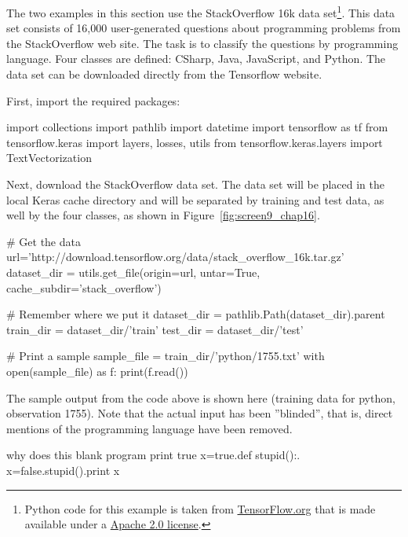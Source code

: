 The two examples in this section use the StackOverflow 16k data set\footnote{Python code for this example is taken from \href{https://www.tensorflow.org/tutorials/load_data/text}{TensorFlow.org} that is made available under a \href{https://www.apache.org/licenses/LICENSE-2.0}{Apache 2.0 license}.}. This data set consists of 16,000 user-generated questions about programming problems from the StackOverflow web site. The task is to classify the questions by programming language. Four classes are defined: CSharp, Java, JavaScript, and Python. The data set can be downloaded directly from the Tensorflow website.

First, import the required packages:

\begin{samepage}
\begin{pythoncode}
import collections
import pathlib
import datetime
import tensorflow as tf
from tensorflow.keras import layers, losses, utils
from tensorflow.keras.layers import TextVectorization
\end{pythoncode}
\end{samepage}

Next, download the StackOverflow data set. The data set will be placed in the local Keras cache directory and will be separated by training and test data, as well by the four classes, as shown in Figure~\ref{fig:screen9_chap16}.

\begin{samepage}
\begin{pythoncode}
# Get the data
url='http://download.tensorflow.org/data/stack_overflow_16k.tar.gz'
dataset_dir = utils.get_file(origin=url, untar=True,
        cache_subdir='stack_overflow')

# Remember where we put it
dataset_dir = pathlib.Path(dataset_dir).parent
train_dir = dataset_dir/'train'
test_dir = dataset_dir/'test'

# Print a sample
sample_file = train_dir/'python/1755.txt'
with open(sample_file) as f:
  print(f.read())
\end{pythoncode}
\end{samepage}

The sample output from the code above is shown here (training data for python, observation 1755). Note that the actual input has been ''blinded'', that is, direct mentions of the programming language have been removed.

\begin{samepage}
\begin{textcode}
why does this blank program print true x=true.def stupid():.
x=false.stupid().print x
\end{textcode}
\end{samepage}

